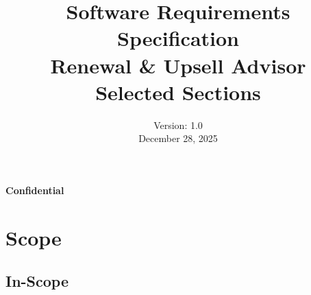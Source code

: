 \documentclass[12pt,a4paper]{article}
\title{\textbf{Software Requirements Specification}\\ \vspace{1cm} \Large Renewal \& Upsell Advisor\\ \vspace{0.5cm} \large Selected Sections}
\author{}
\date{Version: 1.0\\ December 28, 2025}
\begin{document}
\maketitle
\thispagestyle{empty}
\begin{center}
    \textbf{Confidential}
\end{center}

\newpage

\tableofcontents

\newpage

\section{Scope}

\subsection{In-Scope}
\end{document}
